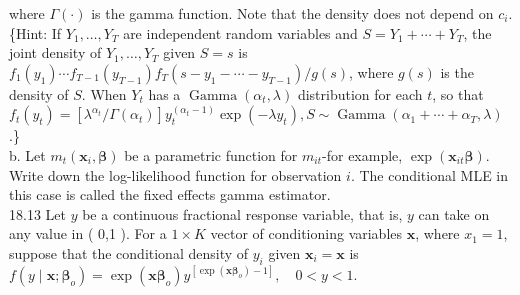 \documentclass[10pt]{article}
\begin{document}
where $\Gamma(\cdot)$ is the gamma function. Note that the density does not depend on $c_{i}$. \{Hint: If $Y_{1}, \ldots, Y_{T}$ are independent random variables and $S=Y_{1}+\cdots+Y_{T}$, the joint density of $Y_{1}, \ldots, Y_{T}$ given $S=s$ is $f_{1}\left(y_{1}\right) \cdots f_{T-1}\left(y_{T-1}\right) f_{T}\left(s-y_{1}-\cdots-y_{T-1}\right) / g(s)$, where $g(s)$ is the density of $S$. When $Y_{t}$ has a $\operatorname{Gamma}\left(\alpha_{t}, \lambda\right)$ distribution for each $t$, so that $f_{t}\left(y_{t}\right)=\left[\lambda^{\alpha_{t}} / \Gamma\left(\alpha_{t}\right)\right] y_{t}^{\left(\alpha_{t}-1\right)} \exp \left(-\lambda y_{t}\right), S \sim \operatorname{Gamma}\left(\alpha_{1}+\cdots+\alpha_{T}, \lambda\right)$.\}\\
b. Let $m_{t}\left(\mathbf{x}_{i}, \boldsymbol{\beta}\right)$ be a parametric function for $m_{i t}$-for example, $\exp \left(\mathbf{x}_{i t} \boldsymbol{\beta}\right)$. Write down the log-likelihood function for observation $i$. The conditional MLE in this case is called the fixed effects gamma estimator.\\
18.13 Let $y$ be a continuous fractional response variable, that is, $y$ can take on any value in ( 0,1 ). For a $1 \times K$ vector of conditioning variables $\mathbf{x}$, where $x_{1}=1$, suppose that the conditional density of $y_{i}$ given $\mathbf{x}_{i}=\mathbf{x}$ is\\
$f\left(y \mid \mathbf{x} ; \boldsymbol{\beta}_{o}\right)=\exp \left(\mathbf{x} \boldsymbol{\beta}_{o}\right) y^{\left[\exp \left(\mathbf{x} \boldsymbol{\beta}_{o}\right)-1\right]}, \quad 0<y<1$.
\end{document}
